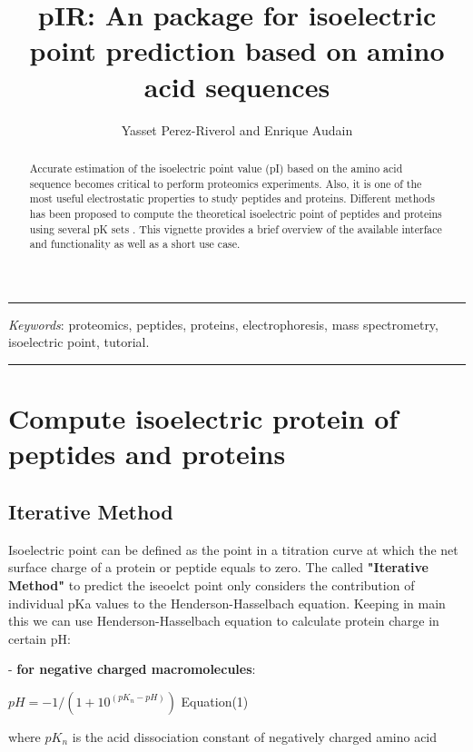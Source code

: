 \documentclass{article}
\title{pIR: An \R{} package for isoelectric point prediction based on amino acid sequences}
\author{Yasset Perez-Riverol and Enrique Audain}
\begin{document}


\maketitle


\hrule
\begin{abstract}
   Accurate estimation of the isoelectric point value (pI) based on the amino acid sequence becomes critical to perform proteomics experiments. Also, it is one of the most useful electrostatic properties to study peptides and proteins. Different methods has been proposed to compute the theoretical isoelectric point of peptides and proteins using several pK sets \cite{perez2012, bjellqvist1993}. This vignette provides a brief overview of the available interface and functionality as well as a short use case.
\end{abstract}

\textit{Keywords}: proteomics, peptides, proteins, electrophoresis, mass spectrometry, isoelectric point, tutorial.
\hrule
{}
\vspace{10mm}


\tableofcontents

\section{Compute isoelectric protein of peptides and proteins}
\subsection{Iterative Method}
 Isoelectric point can be defined as the point in a titration curve at which the net surface charge of a protein or peptide equals to zero. The called \textbf{"Iterative Method"} to predict the iseoelct point only considers the contribution of individual pKa values to the Henderson-Hasselbach equation. Keeping in main this we can use Henderson-Hasselbach equation to calculate protein charge in certain pH:

- \textbf{for negative charged macromolecules}:

\begin{center}
        \( pH = -1/(1+10^{(pK_n - pH)}) \)   Equation(1)
\end{center}

where \(pK_n\) is the acid dissociation constant of negatively charged amino acid
\end{document}
